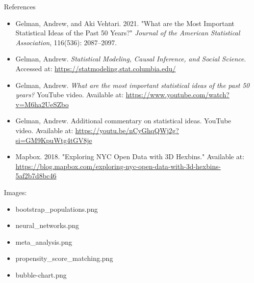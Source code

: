 \documentclass{beamer}
\begin{document}
\begin{frame}{References}
\tiny
\begin{itemize}
    \item Gelman, Andrew, and Aki Vehtari. 2021. "What are the Most Important Statistical Ideas of the Past 50 Years?" 
    \textit{Journal of the American Statistical Association}, 116(536): 2087–2097.
    \item Gelman, Andrew. \textit{Statistical Modeling, Causal Inference, and Social Science}. Accessed at: \url{https://statmodeling.stat.columbia.edu/}
    \item Gelman, Andrew. \textit{What are the most important statistical ideas of the past 50 years?} YouTube video. Available at: \url{https://www.youtube.com/watch?v=M6ha2UeSZbo}
    \item Gelman, Andrew. Additional commentary on statistical ideas. YouTube video. Available at: \url{https://youtu.be/nCyGhqQWj2g?si=GM9KpuWtg4tGV8je}
    \item Mapbox. 2018. "Exploring NYC Open Data with 3D Hexbins." Available at: \url{https://blog.mapbox.com/exploring-nyc-open-data-with-3d-hexbins-5af2b7d8bc46}
\end{itemize}

\footnotesize
Images:
\begin{itemize}
    \item bootstrap\_populations.png
    \item neural\_networks.png
    \item meta\_analysis.png
    \item propensity\_score\_matching.png
    \item bubble-chart.png
\end{itemize}
\end{frame}
\end{document}
